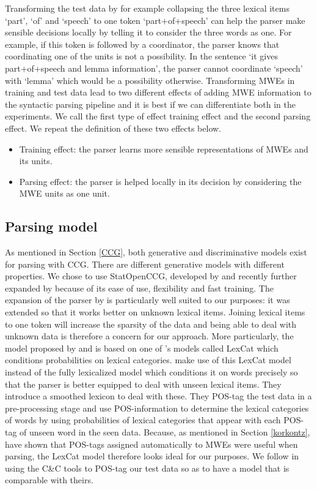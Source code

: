 \documentclass[output=paper]{LSP/langsci}
\begin{document}
\indent Transforming the test data by for example collapsing the three lexical items `part', `of' and `speech' to one token `part+of+speech' can help the parser make sensible decisions locally by telling it to consider the three words as one. For example, if this token is followed by a coordinator, the parser knows that coordinating one of the units is not a possibility. In the sentence `it gives part+of+speech and lemma information', the parser cannot coordinate `speech' with `lemma' which would be a possibility otherwise. Transforming MWEs in training and test data lead to two different effects of adding MWE information to the syntactic parsing pipeline and it is best if we can differentiate both in the experiments. We call the first type of effect training effect and the second parsing effect. We repeat the definition of these two effects below.
    \begin{itemize}
        \item Training effect: the parser learns more sensible representations of MWEs and its units. 
        \item Parsing effect: the parser is helped locally in its decision by considering the MWE units as one unit.
    \end{itemize}

\subsection{Parsing model}
\label{parsingmodel}
\indent As mentioned in Section \ref{CCG}, both generative and discriminative models exist for parsing with CCG. There are different generative models with different properties. We chose to use StatOpenCCG, developed by \citet{christodoulopoulos2008} and recently further expanded by \citet{deoskar} because of its ease of use, flexibility and fast training. The expansion of the parser by \citet{deoskar} is particularly well suited to our purposes: it was extended so that it works better on unknown lexical items. Joining lexical items to one token will increase the sparsity of the data and being able to deal with unknown data is therefore a concern for our approach. More particularly, the model proposed by \citet{christodoulopoulos2008} and \citet{deoskar} is based on one of \citet{hockenmaier2003}'s models called LexCat which conditions probabilities on lexical categories. \citet{deoskar} make use of this LexCat model instead of the fully lexicalized model which conditions it on words precisely so that the parser is better equipped to deal with unseen lexical items. They introduce a smoothed lexicon to deal with these. They POS-tag the test data in a pre-processing stage and use POS-information to determine the lexical categories of words by using probabilities of lexical categories that appear with each POS-tag of unseen word in the seen data. Because, as mentioned in Section \ref{korkontz}, \citet{korkontzelosetal2010} have shown that POS-tags assigned automatically to MWEs were useful when parsing, the LexCat model therefore looks ideal for our purposes. We follow \citet{deoskar} in using the C\&C tools \citep{cctools} to POS-tag our test data so as to have a model that is comparable with theirs.
\end{document}
